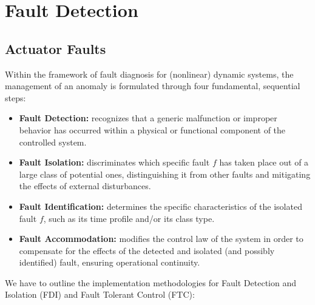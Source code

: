 \documentclass[10pt, a4paper]{report}
\begin{document}
\chapter{Fault Detection}
\section{Actuator Faults}
Within the framework of fault diagnosis for (nonlinear) dynamic systems, the management of an anomaly is formulated through four fundamental, sequential steps:
\begin{itemize}
    \item \textbf{Fault Detection:} recognizes that a generic malfunction or improper behavior has occurred within a physical or functional component of the controlled system.
    \item \textbf{Fault Isolation:} discriminates which specific fault $f$ has taken place out of a large class of potential ones, distinguishing it from other faults and mitigating the effects of external disturbances.
    \item \textbf{Fault Identification:} determines the specific characteristics of the isolated fault $f$, such as its time profile and/or its class type.
    \item \textbf{Fault Accommodation:} modifies the control law of the system in order to compensate for the effects of the detected and isolated (and possibly identified) fault, ensuring operational continuity.
\end{itemize}
We have to outline the implementation methodologies for Fault Detection and Isolation (FDI) and Fault Tolerant Control (FTC):
\end{document}
